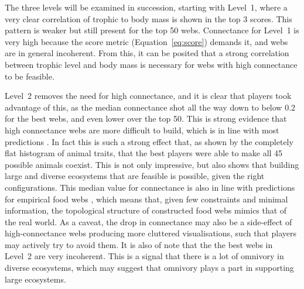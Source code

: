 The three levels will be examined in succession, starting with Level~1, where a very clear correlation of trophic to body mass is shown in the top 3 scores. This pattern is weaker but still present for the top 50 webs.
Connectance for Level~1 is very high because the score metric (Equation~\eqref{eq:score}) demands it, and webs are in general incoherent. From this, it can be posited that a strong correlation between trophic level and body mass is necessary for webs with high connectance to be feasible.

Level~2 removes the need for high connectance, and it is clear that players took advantage of this, as the median connectance shot all the way down to below 0.2 for the best webs, and even lower over the top 50. This is strong evidence that high connectance webs are more difficult to build, which is in line with most predictions \citep{May1973,Allesina2012}.
In fact this is such a strong effect that, as shown by the completely flat histogram of animal traits, that the best players were able to make all 45 possible animals coexist. This is not only impressive, but also shows that building large and diverse ecosystems that are feasible is possible, given the right configurations.
This median value for connectance is also in line with predictions for empirical food webs \citep{Goldwasser1997}, which means that, given few constraints and minimal information, the topological structure of constructed food webs mimics that of the real world.
As a caveat, the drop in connectance may also be a side-effect of high-connectance webs producing more cluttered visualisations, such that players may actively try to avoid them.
It is also of note that the the best webs in Level~2 are very incoherent. This is a signal that there is a lot of omnivory in diverse ecosystems, which may suggest that omnivory plays a part in supporting large ecosystems.

